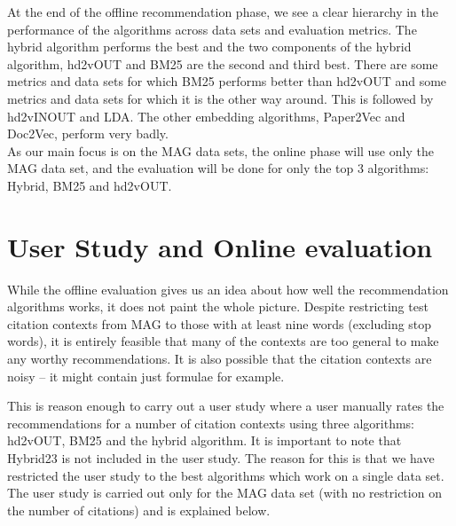 At the end of the offline recommendation phase, we see a clear hierarchy in the performance of the algorithms across data sets and evaluation metrics. The hybrid algorithm performs the best and the two components of the hybrid algorithm, hd2vOUT and BM25 are the second and third best. There are some metrics and data sets for which BM25 performs better than hd2vOUT and some metrics and data sets for which it is the other way around. This is followed by hd2vINOUT and LDA. The other embedding algorithms, Paper2Vec and Doc2Vec, perform very badly. \\
As our main focus is on the MAG data sets, the online phase will use only the MAG data set, and the evaluation will be done for only the top 3 algorithms: Hybrid, BM25 and hd2vOUT.
\section{User Study and Online evaluation}
While the offline evaluation gives us an idea about how well the recommendation algorithms works, it does not paint the whole picture. Despite restricting test citation contexts from MAG to those with at least nine words (excluding stop words), it is entirely feasible that many of the contexts are too general to make any worthy recommendations. It is also possible that the citation contexts are noisy -- it might contain just formulae for example. 

This is reason enough to carry out a user study where a user manually rates the recommendations for a number of citation contexts using three algorithms: hd2vOUT, BM25 and the hybrid algorithm. It is important to note that Hybrid23 is not included in the user study. The reason for this is that we have restricted the user study to the best algorithms which work on a single data set. The user study is carried out only for the MAG data set (with no restriction on the number of citations) and is explained below.

